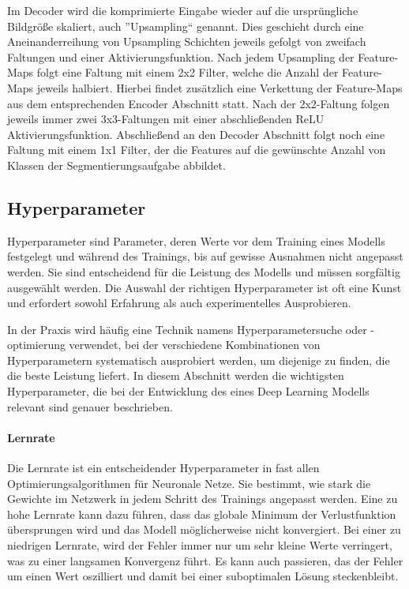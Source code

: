Im Decoder wird die komprimierte Eingabe wieder auf die ursprüngliche Bildgröße skaliert, auch ''Upsampling`` genannt. Dies geschieht durch eine Aneinanderreihung von Upsampling Schichten jeweils gefolgt von zweifach Faltungen und einer Aktivierungsfunktion. Nach jedem Upsampling der Feature-Maps folgt eine Faltung mit einem 2x2 Filter, welche die Anzahl der Feature-Maps jeweils halbiert. Hierbei findet zusätzlich eine Verkettung der Feature-Maps aus dem entsprechenden Encoder Abschnitt statt. Nach der 2x2-Faltung folgen jeweils immer zwei 3x3-Faltungen mit einer abschließenden ReLU Aktivierungsfunktion. Abschließend an den Decoder Abschnitt folgt noch eine Faltung mit einem 1x1 Filter, der die Features auf die gewünschte Anzahl von Klassen der Segmentierungsaufgabe abbildet. \cite[vgl.][]{Ronneberger2015}

\subsection{Hyperparameter}
Hyperparameter sind Parameter, deren Werte vor dem Training eines \gls{Modell}s festgelegt und während des Trainings, bis auf gewisse Ausnahmen nicht angepasst werden. Sie sind entscheidend für die Leistung des Modells und müssen sorgfältig ausgewählt werden. Die Auswahl der richtigen Hyperparameter ist oft eine Kunst und erfordert sowohl Erfahrung als auch experimentelles Ausprobieren. 

In der Praxis wird häufig eine Technik namens Hyperparametersuche oder -optimierung verwendet, bei der verschiedene Kombinationen von Hyperparametern systematisch ausprobiert werden, um diejenige zu finden, die die beste Leistung liefert. In diesem Abschnitt werden die wichtigsten Hyperparameter, die bei der Entwicklung des eines Deep Learning \glspl{Modell} relevant sind genauer beschrieben.

\paragraph{Lernrate} Die Lernrate ist ein entscheidender Hyperparameter in fast allen Optimierungsalgorithmen für Neuronale Netze. Sie bestimmt, wie stark die Gewichte im Netzwerk in jedem Schritt des Trainings angepasst werden. Eine zu hohe Lernrate kann dazu führen, dass das globale Minimum der Verlustfunktion übersprungen wird und das \gls{Modell} möglicherweise nicht konvergiert. Bei einer zu niedrigen Lernrate, wird der Fehler immer nur um sehr kleine Werte verringert, was zu einer langsamen Konvergenz führt. Es kann auch passieren, das der Fehler um einen Wert oszilliert und damit bei einer suboptimalen Lösung steckenbleibt. \cite[vgl.][]{Pfannstiel2022}

